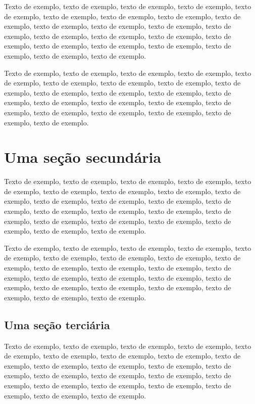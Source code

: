 \documentclass[
	12pt,				%
	oneside,			%
	a4paper,			%
	english,			%
	brazil				%
	]{abntex2ppgsi}
\begin{document}
Texto de exemplo, texto de exemplo, texto de exemplo, texto de exemplo, texto de exemplo, texto de exemplo, texto de exemplo, texto de exemplo, texto de exemplo, texto de exemplo, texto de exemplo, texto de exemplo, texto de exemplo, texto de exemplo, texto de exemplo, texto de exemplo, texto de exemplo, texto de exemplo, texto de exemplo, texto de exemplo, texto de exemplo, texto de exemplo, texto de exemplo.

Texto de exemplo, texto de exemplo, texto de exemplo, texto de exemplo, texto de exemplo, texto de exemplo, texto de exemplo, texto de exemplo, texto de exemplo, texto de exemplo, texto de exemplo, texto de exemplo, texto de exemplo, texto de exemplo, texto de exemplo, texto de exemplo, texto de exemplo, texto de exemplo, texto de exemplo, texto de exemplo, texto de exemplo, texto de exemplo.

\section{Uma seção secundária}

Texto de exemplo, texto de exemplo, texto de exemplo, texto de exemplo, texto de exemplo, texto de exemplo, texto de exemplo, texto de exemplo, texto de exemplo, texto de exemplo, texto de exemplo, texto de exemplo, texto de exemplo, texto de exemplo, texto de exemplo, texto de exemplo, texto de exemplo, texto de exemplo, texto de exemplo, texto de exemplo, texto de exemplo, texto de exemplo, texto de exemplo.

Texto de exemplo, texto de exemplo, texto de exemplo, texto de exemplo, texto de exemplo, texto de exemplo, texto de exemplo, texto de exemplo, texto de exemplo, texto de exemplo, texto de exemplo, texto de exemplo, texto de exemplo, texto de exemplo, texto de exemplo, texto de exemplo, texto de exemplo, texto de exemplo, texto de exemplo, texto de exemplo, texto de exemplo, texto de exemplo, texto de exemplo.

\subsection{Uma seção terciária}

Texto de exemplo, texto de exemplo, texto de exemplo, texto de exemplo, texto de exemplo, texto de exemplo, texto de exemplo, texto de exemplo, texto de exemplo, texto de exemplo, texto de exemplo, texto de exemplo, texto de exemplo, texto de exemplo, texto de exemplo, texto de exemplo, texto de exemplo, texto de exemplo, texto de exemplo, texto de exemplo, texto de exemplo, texto de exemplo, texto de exemplo.
\end{document}
